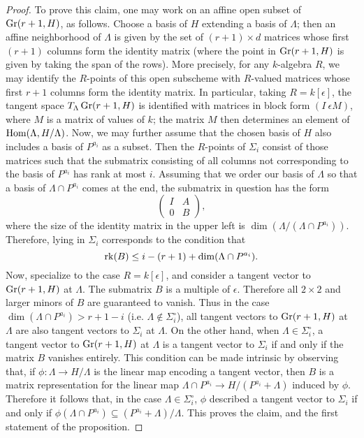 \documentclass{amsart}
\begin{document}
\begin{proof}
To prove this claim, one may work on an affine open subset of $\operatorname{Gr}(r+1,H)$, as
follows. Choose a basis of $H$ extending a basis of $\Lambda$; then an affine
neighborhood of $\Lambda$ is given by the set of $(r+1) \times d$ matrices
whose first $(r+1)$ columns form the identity matrix (where the point in
$\operatorname{Gr}(r+1,H)$ is given by taking the span of the rows). More precisely, for any
$k$-algebra $R$, we may identify the $R$-points of this open subscheme with
$R$-valued matrices whose first $r+1$ columns form the identity matrix. In
particular, taking $R = k[\epsilon]$, the tangent space $T_{\Lambda}
\operatorname{Gr}(r+1,H)$ is identified with matrices in block form $( I\  \epsilon M)$,
where $M$ is a matrix of values of $k$; the matrix $M$ then determines an
element of $\operatorname{Hom}(\Lambda,H / \Lambda)$. Now, we may further assume that the
chosen basis of $H$ also includes a basis of $P^{a_i}$ as a subset. Then the
$R$-points of $\Sigma_i$ consist of those matrices such that the submatrix
consisting of all columns not corresponding to the basis of $P^{a_i}$ has rank
at most $i$. Assuming that we order our basis of $\Lambda$ so that a basis of $\Lambda
\cap P^{a_i}$ comes at the end, the submatrix in
question has the form
$$\begin{pmatrix} I & A \\ 0 & B \end{pmatrix},$$
where the size of the identity matrix in the upper left is $\dim (\Lambda /
(\Lambda \cap P^{a_i}))$. Therefore, lying in $\Sigma_i$ corresponds to the
condition that
$$\operatorname{rk}(B) \leq i - (r+1) + \dim (\Lambda \cap P^{a_i}).$$
Now, specialize to the case $R = k[\epsilon]$, and consider a tangent vector to
$\operatorname{Gr}(r+1,H)$ at $\Lambda$. The submatrix $B$ is a multiple of $\epsilon$.
Therefore all $2 \times 2$ and larger minors of $B$ are guaranteed to vanish.
Thus in the case $\dim (\Lambda \cap P^{a_i}) > r+1-i$ (i.e. $\Lambda \not\in
\Sigma_i^\circ$), all tangent vectors to $\operatorname{Gr}(r+1,H)$ at $\Lambda$ are also
tangent vectors to $\Sigma_i$ at $\Lambda$. On the other hand, when $\Lambda
\in \Sigma_i^\circ$, a tangent vector to $\operatorname{Gr}(r+1,H)$ at $\Lambda$ is a tangent
vector to $\Sigma_i$ if and only if the matrix $B$ vanishes entirely. This
condition can be made intrinsic by observing that, if $\phi\colon \Lambda
\rightarrow H / \Lambda$ is the linear map encoding a tangent vector, then $B$
is a matrix representation for the linear map $\Lambda \cap P^{a_i} \to H /
(P^{a_i} + \Lambda)$ induced by $\phi$. Therefore it follows that, in the case
$\Lambda \in \Sigma_i^\circ$, $\phi$ described a tangent vector to $\Sigma_i$
if and only if $\phi(\Lambda \cap P^{a_i}) \subseteq (P^{a_i} +
\Lambda)/\Lambda$. This proves the claim, and the first statement of
the proposition.


\end{proof}
\end{document}
